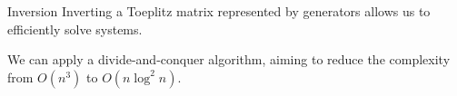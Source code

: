 \begin{frame}{Inversion}
    Inverting a Toeplitz matrix represented by generators allows us to efficiently solve systems.

    We can apply a divide-and-conquer algorithm, aiming to reduce the complexity from $O(n^3)$ to $O(n \log^2 n)$.
\end{frame}